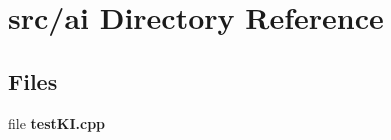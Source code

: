 \section{src/ai Directory Reference}
\label{dir_128a93aeeff33a8423f079f46929dbb3}
\subsection*{Files}
\begin{DoxyCompactItemize}
\item 
file {\bfseries test\-K\-I.\-cpp}
\end{DoxyCompactItemize}
